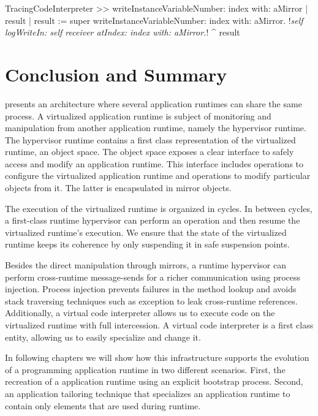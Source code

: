 \begin{code}
TracingCodeInterpreter >> writeInstanceVariableNumber: index with: aMirror
    | result |
    result := super writeInstanceVariableNumber: index with: aMirror.
    !\emph{self logWriteIn: self receiver atIndex: index with: aMirror.}!
    ^ result
\end{code}

\section{Conclusion and Summary}

\Vtt presents an architecture where several application runtimes can share the same process. A virtualized application runtime is subject of monitoring and manipulation from another application runtime, namely the hypervisor runtime. The hypervisor runtime contains a first class representation of the virtualized runtime, an object space. The object space exposes a clear interface to safely access and modify an application runtime. This interface includes operations to configure the virtualized application runtime and operations to modify particular objects from it. The latter is encapsulated in mirror objects.

The execution of the virtualized runtime is organized in cycles. In between cycles, a first-class runtime hypervisor can perform an operation and then resume the virtualized runtime's execution. We ensure that the state of the virtualized runtime keeps its coherence by only suspending it in safe suspension points.

Besides the direct manipulation through mirrors, a runtime hypervisor can perform cross-runtime message-sends for a richer communication using process injection. Process injection prevents failures in the method lookup and avoids stack traversing techniques such as exception to leak cross-runtime references. Additionally, a virtual code interpreter allows us to execute code on the virtualized runtime with full intercession. A virtual code interpreter is a first class entity, allowing us to easily specialize and change it.

In following chapters we will show how this infrastructure supports the evolution of a programming application runtime in two different scenarios. First, the recreation of a application runtime using an explicit bootstrap process. Second, an application tailoring technique that specializes an application runtime to contain only elements that are used during runtime.

